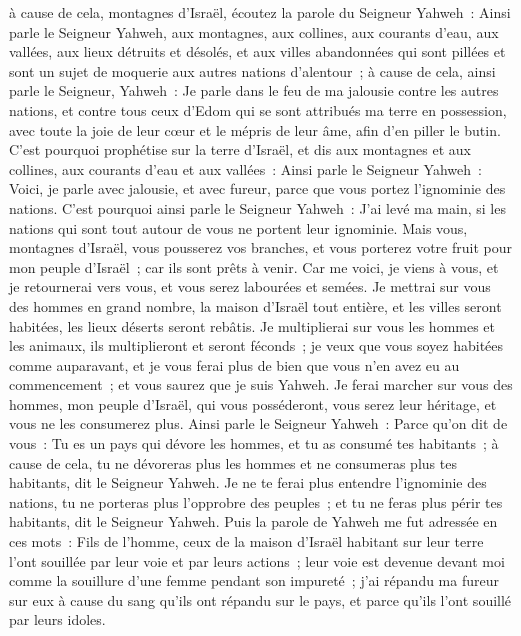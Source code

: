 \begin{multicols}{2}
à cause de cela, montagnes d'Israël, écoutez la parole du Seigneur Yahweh~: Ainsi parle le Seigneur Yahweh, aux montagnes, aux collines, aux courants d'eau, aux vallées, aux lieux détruits et désolés, et aux villes abandonnées qui sont pillées et sont un sujet de moquerie aux autres nations d'alentour~;
à cause de cela, ainsi parle le Seigneur, Yahweh~: Je parle dans le feu de ma jalousie contre les autres nations, et contre tous ceux d'Edom qui se sont attribués ma terre en possession, avec toute la joie de leur cœur et le mépris de leur âme, afin d'en piller le butin.
C'est pourquoi prophétise sur la terre d'Israël, et dis aux montagnes et aux collines, aux courants d'eau et aux vallées~: Ainsi parle le Seigneur Yahweh~: Voici, je parle avec jalousie, et avec fureur, parce que vous portez l'ignominie des nations.
C'est pourquoi ainsi parle le Seigneur Yahweh~: J'ai levé ma main, si les nations qui sont tout autour de vous ne portent leur ignominie.
Mais vous, montagnes d'Israël, vous pousserez vos branches, et vous porterez votre fruit pour mon peuple d'Israël~; car ils sont prêts à venir.
Car me voici, je viens à vous, et je retournerai vers vous, et vous serez labourées et semées.
Je mettrai sur vous des hommes en grand nombre, la maison d'Israël tout entière, et les villes seront habitées, les lieux déserts seront rebâtis.
Je multiplierai sur vous les hommes et les animaux, ils multiplieront et seront féconds~; je veux que vous soyez habitées comme auparavant, et je vous ferai plus de bien que vous n'en avez eu au commencement~; et vous saurez que je suis Yahweh.
Je ferai marcher sur vous des hommes, mon peuple d'Israël, qui vous posséderont, vous serez leur héritage, et vous ne les consumerez plus.
Ainsi parle le Seigneur Yahweh~: Parce qu'on dit de vous~: Tu es un pays qui dévore les hommes, et tu as consumé tes habitants~;
à cause de cela, tu ne dévoreras plus les hommes et ne consumeras plus tes habitants, dit le Seigneur Yahweh.
Je ne te ferai plus entendre l'ignominie des nations, tu ne porteras plus l'opprobre des peuples~; et tu ne feras plus périr tes habitants, dit le Seigneur Yahweh.
Puis la parole de Yahweh me fut adressée en ces mots~:
Fils de l'homme, ceux de la maison d'Israël habitant sur leur terre l'ont souillée par leur voie et par leurs actions~; leur voie est devenue devant moi comme la souillure d'une femme pendant son impureté~;
j'ai répandu ma fureur sur eux à cause du sang qu'ils ont répandu sur le pays, et parce qu'ils l'ont souillé par leurs idoles.

\end{multicols}
